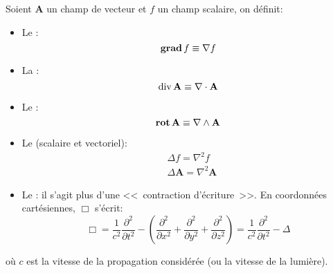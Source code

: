 \ifVersionDuDocEstVincent\medskip\fi
Soient $\mathbf{A} $ un champ de vecteur et $f$ un champ scalaire, on définit:
\begin{itemize}
\item Le :
\begin{equation}  \operatorname{\mathbf{grad}} f  \equiv \nabla f \end{equation}

\item La :
\begin{equation} \operatorname{div} \mathbf{A}  \equiv \nabla\cdot\mathbf{A}  \end{equation}

\item Le :
\begin{equation} \operatorname{\mathbf{rot}} {\mathbf{A} } \equiv \nabla \wedge \mathbf{A}  \end{equation}

\item Le  (scalaire et vectoriel):
\begin{align} &\Delta f = \nabla^2 f\\
&\Delta \mathbf{A}  = \nabla^2 \mathbf{A} \end{align}

\item Le : il s'agit plus d'une <<~contraction d'écriture~>>.
En coordonnées cartésiennes, $\Box$ s'écrit:
\begin{equation}
    \Box = \frac{1}{c^2}\frac{\partial^2}{\partial t^2} - \left(\frac{\partial^2}{\partial x^2} + \frac{\partial^2}{\partial y^2} + \frac{\partial^2}{\partial z^2}\right)
   = \frac{1}{c^2}\frac{\partial^2}{\partial t^2} - \Delta
\end{equation}
\end{itemize}
où $c$ est la vitesse de la propagation considérée (ou la vitesse de la lumière).

